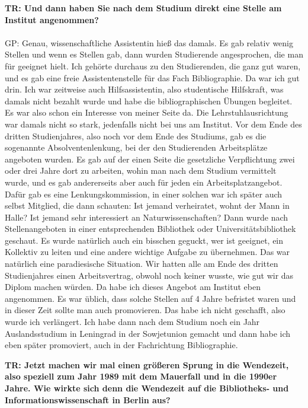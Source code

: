 \documentclass[a4paper,
fontsize=11pt,
oneside,
numbers=noperiodatend,
parskip=half-,
bibliography=totoc,
final
]{scrartcl}
\begin{document}
\textbf{TR: Und dann haben Sie nach dem Studium direkt eine Stelle am
Institut angenommen?\\
}~\\
GP: Genau, wissenschaftliche Assistentin hieß das damals. Es gab relativ
wenig Stellen und wenn es Stellen gab, dann wurden Studierende
angesprochen, die man für geeignet hielt. Ich gehörte durchaus zu den
Studierenden, die ganz gut waren, und es gab eine freie
Assistentenstelle für das Fach Bibliographie. Da war ich gut drin. Ich
war zeitweise auch Hilfsassistentin, also studentische Hilfskraft, was
damals nicht bezahlt wurde und habe die bibliographischen Übungen
begleitet. Es war also schon ein Interesse von meiner Seite da. Die
Lehrstuhlausrichtung war damals nicht so stark, jedenfalls nicht bei uns
am Institut. Vor dem Ende des dritten Studienjahres, also noch vor dem
Ende des Studiums, gab es die sogenannte Absolventenlenkung, bei der den
Studierenden Arbeitsplätze angeboten wurden. Es gab auf der einen Seite
die gesetzliche Verpflichtung zwei oder drei Jahre dort zu arbeiten,
wohin man nach dem Studium vermittelt wurde, und es gab andererseits
aber auch für jeden ein Arbeitsplatzangebot. Dafür gab es eine
Lenkungskommission, in einer solchen war ich später auch selbst
Mitglied, die dann schauten: Ist jemand verheiratet, wohnt der Mann in
Halle? Ist jemand sehr interessiert an Naturwissenschaften? Dann wurde
nach Stellenangeboten in einer entsprechenden Bibliothek oder
Universitätsbibliothek geschaut. Es wurde natürlich auch ein bisschen
geguckt, wer ist geeignet, ein Kollektiv zu leiten und eine andere
wichtige Aufgabe zu übernehmen. Das war natürlich eine paradiesische
Situation. Wir hatten alle am Ende des dritten Studienjahres einen
Arbeitsvertrag, obwohl noch keiner wusste, wie gut wir das Diplom machen
würden. Da habe ich dieses Angebot am Institut eben angenommen. Es war
üblich, dass solche Stellen auf 4 Jahre befristet waren und in dieser
Zeit sollte man auch promovieren. Das habe ich nicht geschafft, also
wurde ich verlängert. Ich habe dann nach dem Studium noch ein Jahr
Auslandsstudium in Leningrad in der Sowjetunion gemacht und dann habe
ich eben später promoviert, auch in der Fachrichtung Bibliographie.

\textbf{TR: Jetzt machen wir mal einen größeren Sprung in die Wendezeit,
also speziell zum Jahr 1989 mit dem Mauerfall und in die 1990er Jahre.
Wie wirkte sich denn die Wendezeit auf die Bibliotheks- und
Informationswissenschaft in Berlin aus?}
\end{document}
